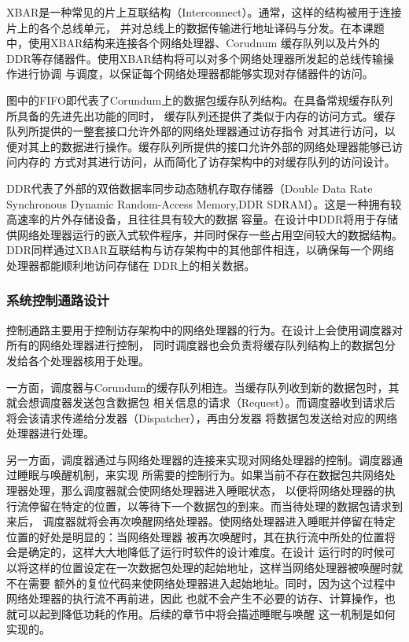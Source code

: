 XBAR是一种常见的片上互联结构（Interconnect）。通常，这样的结构被用于连接片上的各个总线单元，
并对总线上的数据传输进行地址译码与分发。在本课题中，使用XBAR结构来连接各个网络处理器、Corudnum
缓存队列以及片外的DDR等存储器件。使用XBAR结构将可以对多个网络处理器所发起的总线传输操作进行协调
与调度，以保证每个网络处理器都能够实现对存储器件的访问。

图中的FIFO即代表了Corundum上的数据包缓存队列结构。在具备常规缓存队列所具备的先进先出功能的同时，
缓存队列还提供了类似于内存的访问方式。缓存队列所提供的一整套接口允许外部的网络处理器通过访存指令
对其进行访问，以便对其上的数据进行操作。缓存队列所提供的接口允许外部的网络处理器能够已访问内存的
方式对其进行访问，从而简化了访存架构中的对缓存队列的访问设计。

DDR代表了外部的双倍数据率同步动态随机存取存储器（Double Data Rate Synchronous Dynamic
Random-Access Memory,DDR SDRAM）。这是一种拥有较高速率的片外存储设备，且往往具有较大的数据
容量。在设计中DDR将用于存储供网络处理器运行的嵌入式软件程序，并同时保存一些占用空间较大的数据结构。
DDR同样通过XBAR互联结构与访存架构中的其他部件相连，以确保每一个网络处理器都能顺利地访问存储在
DDR上的相关数据。

\subsubsection{系统控制通路设计}

控制通路主要用于控制访存架构中的网络处理器的行为。在设计上会使用调度器对所有的网络处理器进行控制，
同时调度器也会负责将缓存队列结构上的数据包分发给各个处理器核用于处理。


一方面，调度器与Corundum的缓存队列相连。当缓存队列收到新的数据包时，其就会想调度器发送包含数据包
相关信息的请求（Request）。而调度器收到请求后将会该请求传递给分发器（Dispatcher），再由分发器
将数据包发送给对应的网络处理器进行处理。

另一方面，调度器通过与网络处理器的连接来实现对网络处理器的控制。调度器通过睡眠与唤醒机制，来实现
所需要的控制行为。如果当前不存在数据包共网络处理器处理，那么调度器就会使网络处理器进入睡眠状态，
以便将网络处理器的执行流停留在特定的位置，以等待下一个数据包的到来。而当待处理的数据包请求到来后，
调度器就将会再次唤醒网络处理器。使网络处理器进入睡眠并停留在特定位置的好处是明显的：当网络处理器
被再次唤醒时，其在执行流中所处的位置将会是确定的，这样大大地降低了运行时软件的设计难度。在设计
运行时的时候可以将这样的位置设定在一次数据包处理的起始地址，这样当网络处理器被唤醒时就不在需要
额外的复位代码来使网络处理器进入起始地址。同时，因为这个过程中网络处理器的执行流不再前进，因此
也就不会产生不必要的访存、计算操作，也就可以起到降低功耗的作用。后续的章节中将会描述睡眠与唤醒
这一机制是如何实现的。

